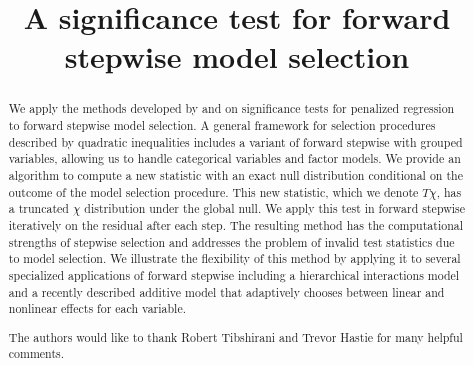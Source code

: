\documentclass{imsart}
\begin{document}
\begin{frontmatter}

\title{A significance test for forward stepwise model selection}


\author{ 
\and {} }


\address{Department of Statistics\\  Stanford University\\ Sequoia
Hall \\390 Serra Mall\\ Stanford, CA 94305, U.S.A.\\ }


\begin{abstract}
  We apply the methods developed by \cite{significance:lasso} and
  \cite{tests:adaptive} on significance tests for penalized
  regression to forward stepwise model selection. A general framework
  for selection procedures described by quadratic inequalities includes
  a variant of forward stepwise with grouped variables, allowing us to
  handle categorical variables and factor models. We provide an algorithm
  to compute a new statistic with an exact null distribution conditional
  on the outcome of the model selection procedure. This new
  statistic, which we denote $T\chi$,
  has a truncated $\chi$ distribution under the global null.
  We apply this test in forward stepwise iteratively on the residual after
  each step. The resulting method
  has the computational strengths of stepwise selection and addresses
  the problem of invalid test statistics due to model selection.
  We illustrate the flexibility of this method by applying it to
  several specialized applications of forward stepwise including a
  hierarchical interactions model and a recently described additive model
  that adaptively chooses between linear and nonlinear effects for
  each variable. 
\end{abstract}

\renewcommand{\abstractname}{Acknowledgements}
\begin{abstract}
The authors would like to thank Robert Tibshirani and Trevor Hastie for many helpful comments.
\end{abstract}

\begin{keyword}[class=AMS]
\end{keyword}

\begin{keyword}
\end{keyword}

\end{frontmatter}
\end{document}
